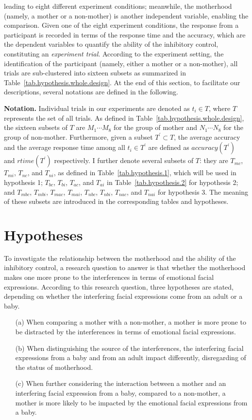 leading to eight different experiment conditions;
meanwhile,
the motherhood (namely, a mother or a non-mother)
is another independent variable, enabling the comparison.
Given one of the eight experiment conditions,
the response from a participant is recorded in terms of  
the response time and the accuracy, which are the dependent 
variables to quantify the ability of the inhibitory control,
constituting an \textit{experiment trial}.
According to the experiment setting,
the identification of the participant (namely, either a mother or a non-mother),
all trials are sub-clustered into sixteen subsets as summarized in 
Table~\ref{tab.hypothesis.whole.design}.
At the end of this section, 
to facilitate our descriptions,
several notations are defined in the following.


\textbf{Notation.}
Individual trials in our experiments are denoted as $t_i\in T$, 
where $T$ represents the set of all trials. 
As defined in Table~\ref{tab.hypothesis.whole.design}, 
the sixteen subsets of $T$ are $M_1\cdots M_8$ for the group of mother 
and $N_1\cdots N_8$ for the group of non-mother.
Furthermore, given a subset $T^\prime\subset T$, the average accuracy and the average response time among all $t_i \in T^\prime$ are defined as $\mathit{accuracy}(T^\prime)$ and $\mathit{rtime}(T^\prime)$ respectively. 
I further denote several subsets of $T$: they are 
$T_{mc}$, $T_{mi}$, $T_{nc}$, and $T_{ni}$, as defined in Table~\ref{tab.hypothesis.1},
which will be used in hypothesis 1;
$T_{bc}$, $T_{bi}$, $T_{ac}$, and $T_{ai}$ in Table~\ref{tab.hypothesis.2} for hypothesis 2;
and $T_{mbc}$, $T_{mbi}$, $T_{mac}$, $T_{mai}$, $T_{nbc}$, $T_{nbi}$, $T_{nac}$, and $T_{nai}$ for 
hypothesis 3. The meaning of these subsets are introduced in the corresponding tables and hypotheses.

		
\section{Hypotheses}\label{sec.hypothesis}
To investigate the relationship between the motherhood and the ability of the inhibitory control,
a research question to answer is that 
whether the motherhood makes one more prone to the interferences in terms of emotional facial expressions.
According to this research question, three hypotheses are stated, depending on whether the interfering facial expressions come from
an adult or a baby.
\begin{itemize}
\item[(a)] When comparing a mother with a non-mother, a mother is more prone to be distracted by the interferences in terms of emotional facial expressions.
\item[(b)] When distinguishing the source of the interferences, the interfering facial expressions from a baby and from an adult impact differently, disregarding of the status of motherhood.
\item[(c)] 
When further considering the interaction between a mother and an interfering facial expression from a baby, 
compared to a non-mother, a mother is more likely to be impacted by the emotional facial expressions from a baby.
\end{itemize}


